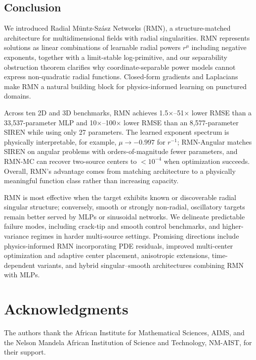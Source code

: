 \documentclass[twoside,11pt]{article}
\begin{document}
\subsection{Conclusion}
\label{sec:conclusion}

We introduced Radial M\"untz-Sz\'asz Networks (RMN), a structure-matched architecture for multidimensional fields with radial singularities. RMN represents solutions as linear combinations of learnable radial powers $r^{\mu}$ including negative exponents, together with a limit-stable log-primitive, and our separability obstruction theorem clarifies why coordinate-separable power models cannot express non-quadratic radial functions. Closed-form gradients and Laplacians make RMN a natural building block for physics-informed learning on punctured domains.

Across ten 2D and 3D benchmarks, RMN achieves 1.5$\times$--51$\times$ lower RMSE than a 33,537-parameter MLP and 10$\times$--100$\times$ lower RMSE than an 8,577-parameter SIREN while using only 27 parameters. The learned exponent spectrum is physically interpretable, for example, $\mu \to -0.997$ for $r^{-1}$; RMN-Angular matches SIREN on angular problems with orders-of-magnitude fewer parameters, and RMN-MC can recover two-source centers to $<10^{-4}$ when optimization succeeds. Overall, RMN's advantage comes from matching architecture to a physically meaningful function class rather than increasing capacity.

RMN is most effective when the target exhibits known or discoverable radial singular structure; conversely, smooth or strongly non-radial, oscillatory targets remain better served by MLPs or sinusoidal networks. We delineate predictable failure modes, including crack-tip and smooth control benchmarks, and higher-variance regimes in harder multi-source settings. Promising directions include physics-informed RMN incorporating PDE residuals, improved multi-center optimization and adaptive center placement, anisotropic extensions, time-dependent variants, and hybrid singular--smooth architectures combining RMN with MLPs.

\section*{Acknowledgments}

The authors thank the African Institute for Mathematical Sciences, AIMS, and the Nelson Mandela African Institution of Science and Technology, NM-AIST, for their support.
\end{document}
